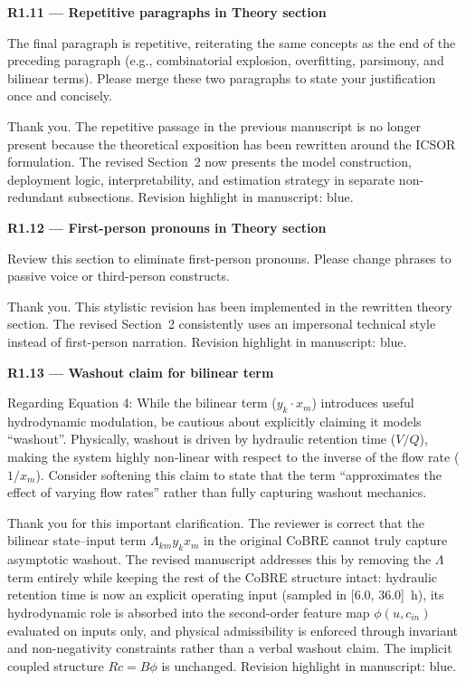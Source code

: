 \documentclass[a4paper,11pt]{article}
\newcommand{\reviewlabel}[1]{\noindent\textbf{\textcolor{accentblue}{#1}}\par\medskip}
\newcommand{\revhighlight}[2]{\textcolor{#1}{Revision highlight in manuscript: #2.}}
\begin{document}
\reviewlabel{R1.11 --- Repetitive paragraphs in Theory section}
\begin{reviewbox}
The final paragraph is repetitive, reiterating the same concepts as the end of the preceding paragraph (e.g., combinatorial explosion, overfitting, parsimony, and bilinear terms). Please merge these two paragraphs to state your justification once and concisely.
\end{reviewbox}

Thank you. The repetitive passage in the previous manuscript is no longer present because the theoretical exposition has been rewritten around the ICSOR formulation. The revised Section~2 now presents the model construction, deployment logic, interpretability, and estimation strategy in separate non-redundant subsections. \revhighlight{revDefault}{blue}

\reviewlabel{R1.12 --- First-person pronouns in Theory section}
\begin{reviewbox}
Review this section to eliminate first-person pronouns. Please change phrases to passive voice or third-person constructs.
\end{reviewbox}

Thank you. This stylistic revision has been implemented in the rewritten theory section. The revised Section~2 consistently uses an impersonal technical style instead of first-person narration. \revhighlight{revDefault}{blue}

\reviewlabel{R1.13 --- Washout claim for bilinear term}
\begin{reviewbox}
Regarding Equation 4: While the bilinear term ($y_k \cdot x_m$) introduces useful hydrodynamic modulation, be cautious about explicitly claiming it models ``washout''. Physically, washout is driven by hydraulic retention time ($V/Q$), making the system highly non-linear with respect to the inverse of the flow rate ($1/x_m$). Consider softening this claim to state that the term ``approximates the effect of varying flow rates'' rather than fully capturing washout mechanics.
\end{reviewbox}

Thank you for this important clarification. The reviewer is correct that the bilinear state--input term $\Lambda_{km} y_k x_m$ in the original CoBRE cannot truly capture asymptotic washout. The revised manuscript addresses this by removing the $\Lambda$ term entirely while keeping the rest of the CoBRE structure intact: hydraulic retention time is now an explicit operating input (sampled in [6.0, 36.0]~h), its hydrodynamic role is absorbed into the second-order feature map $\phi(u, c_{in})$ evaluated on inputs only, and physical admissibility is enforced through invariant and non-negativity constraints rather than a verbal washout claim. The implicit coupled structure $Rc = B\phi$ is unchanged. \revhighlight{revDefault}{blue}
\end{document}

